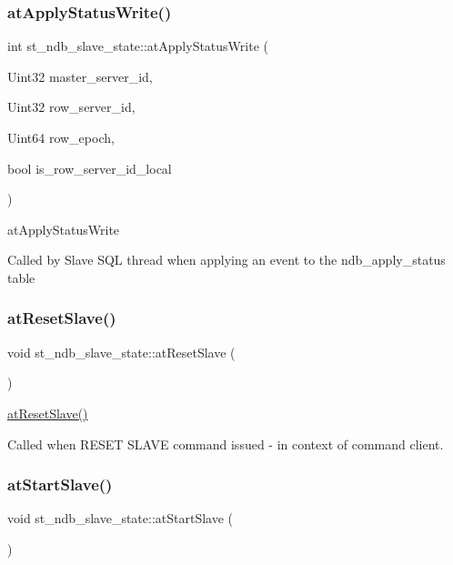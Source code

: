 \subsubsection{\texorpdfstring{at\+Apply\+Status\+Write()}{atApplyStatusWrite()}}
{\footnotesize\ttfamily int st\+\_\+ndb\+\_\+slave\+\_\+state\+::at\+Apply\+Status\+Write (\begin{DoxyParamCaption}\item[{Uint32}]{master\+\_\+server\+\_\+id,  }\item[{Uint32}]{row\+\_\+server\+\_\+id,  }\item[{Uint64}]{row\+\_\+epoch,  }\item[{bool}]{is\+\_\+row\+\_\+server\+\_\+id\+\_\+local }\end{DoxyParamCaption})}

at\+Apply\+Status\+Write

Called by Slave S\+QL thread when applying an event to the ndb\+\_\+apply\+\_\+status table \mbox{\label{structst__ndb__slave__state_af4b936c6ad89721386871d7d4808a806}} 
\subsubsection{\texorpdfstring{at\+Reset\+Slave()}{atResetSlave()}}
{\footnotesize\ttfamily void st\+\_\+ndb\+\_\+slave\+\_\+state\+::at\+Reset\+Slave (\begin{DoxyParamCaption}{ }\end{DoxyParamCaption})}

\mbox{\hyperlink{structst__ndb__slave__state_af4b936c6ad89721386871d7d4808a806}{at\+Reset\+Slave()}}

Called when R\+E\+S\+ET S\+L\+A\+VE command issued -\/ in context of command client. \mbox{\label{structst__ndb__slave__state_a48c3936791f966c865d2c28a0b305012}} 
\subsubsection{\texorpdfstring{at\+Start\+Slave()}{atStartSlave()}}
{\footnotesize\ttfamily void st\+\_\+ndb\+\_\+slave\+\_\+state\+::at\+Start\+Slave (\begin{DoxyParamCaption}{ }\end{DoxyParamCaption})}

